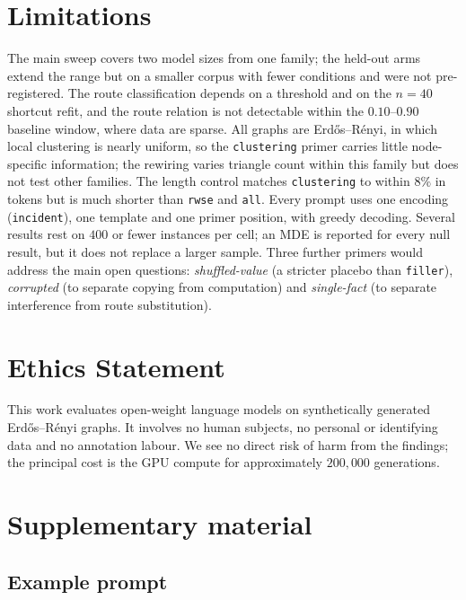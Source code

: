 \documentclass[11pt]{article}
\begin{document}
\section*{Limitations}
\label{sec:limitations}

The main sweep covers two model sizes from one family; the held-out arms
extend the range but on a smaller corpus with fewer conditions and were not
pre-registered. The route classification depends on a threshold and on the
$n{=}40$ shortcut refit, and the route relation is not detectable within
the $0.10$--$0.90$ baseline window, where data are sparse. All graphs are
Erd\H{o}s--R\'enyi, in which local clustering is nearly uniform, so the
\texttt{clustering} primer carries little node-specific information; the
rewiring varies triangle count within this family but does not test other
families. The length control matches \texttt{clustering} to within $8\%$ in
tokens but is much shorter than \texttt{rwse} and \texttt{all}. Every prompt
uses one encoding (\texttt{incident}), one template and one primer
position, with greedy decoding. Several results rest on $400$ or fewer
instances per cell; an MDE is reported for every null result, but it does
not replace a larger sample. Three further primers would address the main
open questions: \emph{shuffled-value} (a stricter placebo than
\texttt{filler}), \emph{corrupted} (to separate copying from computation)
and \emph{single-fact} (to separate interference from route substitution).

\section*{Ethics Statement}

This work evaluates open-weight language models on synthetically generated
Erd\H{o}s--R\'enyi graphs. It involves no human subjects, no personal or
identifying data and no annotation labour. We see no direct risk of harm
from the findings; the principal cost is the GPU compute for approximately
$200{,}000$ generations.



\appendix

\section{Supplementary material}
\label{sec:appendix}

\subsection{Example prompt}
\label{sec:appendix-prompt}
\end{document}

